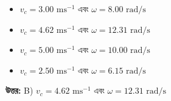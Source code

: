 \documentclass[12pt, a4paper]{article}
\begin{document}
\begin{itemize}[label={}, leftmargin=1cm, itemsep=0.5em]
\item[\textbf{A)}] $v_c = 3.00\text{ ms}^{-1}$ এবং $\omega = 8.00\text{ rad/s}$
\item[\textbf{B)}] $v_c = 4.62\text{ ms}^{-1}$ এবং $\omega = 12.31\text{ rad/s}$
\item[\textbf{C)}] $v_c = 5.00\text{ ms}^{-1}$ এবং $\omega = 10.00\text{ rad/s}$
\item[\textbf{D)}] $v_c = 2.50\text{ ms}^{-1}$ এবং $\omega = 6.15\text{ rad/s}$
\end{itemize}
\vspace{0.5em}

\begin{tcolorbox}[answerbox]
\textbf{\color{success} উত্তর:} B) $v_c = 4.62\text{ ms}^{-1}$ এবং $\omega = 12.31\text{ rad/s}$
\end{tcolorbox}
\vspace{1em}
\end{document}
